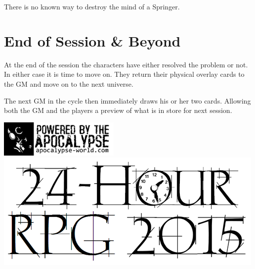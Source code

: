 \documentclass[letterpaper,12pt,landscape,twocolumn]{book}
\begin{document}
There is no known way to destroy the mind of a Springer. 


\section{End of Session \& Beyond}

At the end of the session the characters have either resolved the
problem or not. In either case it is time to move on. They return
their physical overlay cards to the GM and move on to the next
universe.

The next GM in the cycle then immediately draws his or her two
cards. Allowing both the GM and the players a preview of what is in
store for next session.

\includegraphics{./images/poweredby.jpg}
\includegraphics{./images/24hour.png}
\end{document}

